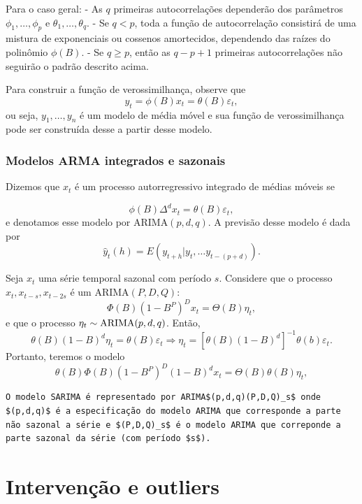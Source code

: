 \documentclass[
  letterpaper,
  DIV=11,
  numbers=noendperiod]{scrartcl}
\theoremstyle{plain}
\theoremstyle{plain}
\theoremstyle{definition}
\theoremstyle{definition}
\theoremstyle{remark}
\begin{document}
Para o caso geral: - As \(q\) primeiras autocorrelações dependerão dos
parâmetros \(\phi_1,\ldots,\phi_p\) e \(\theta_1,\ldots,\theta_q\). - Se
\(q<p\), toda a função de autocorrelação consistirá de uma mistura de
exponenciais ou cossenos amortecidos, dependendo das raízes do polinômio
\(\phi(B)\). - Se \(q\geq p\), então as \(q-p+1\) primeiras
autocorrelações não seguirão o padrão descrito acima.

Para construir a função de verossimilhança, observe que
\[y_t=\phi(B)x_t=\theta(B)\varepsilon_t,\] ou seja, \(y_1,\ldots,y_n\) é
um modelo de média móvel e sua função de verossimilhança pode ser
construída desse a partir desse modelo.

\hypertarget{modelos-arma-integrados-e-sazonais}{%
\subsection{Modelos ARMA integrados e
sazonais}\label{modelos-arma-integrados-e-sazonais}}

Dizemos que \(x_t\) é um processo autorregressivo integrado de médias
móveis se

\[\phi(B)\Delta^d x_t =\theta(B)\varepsilon_t,\] e denotamos esse modelo
por ARIMA\((p,d,q)\). A previsão desse modelo é dada por
\[\hat{y}_t(h)=E(y_{t+h}|y_t,\ldots y_{t-(p+d)}).\]

Seja \(x_t\) uma série temporal sazonal com período \(s\). Considere que
o processo \({x_t,x_{t-s},x_{t-2s}}\) é um ARIMA\((P,D,Q)\):
\[\Phi(B)(1-B^P)^Dx_t = \Theta(B)\eta_t,\] e que o processo
\(\eta_t\sim \hbox{ARIMA}(p,d,q)\). Então,
\[\theta(B)(1-B)^d\eta_t = \theta(B)\varepsilon_t\Rightarrow \eta_t = \left[\theta(B)(1-B)^d\right]^{-1}\theta(b)\varepsilon_t.\]
Portanto, teremos o modelo
\[\theta(B)\Phi(B)(1-B^P)^D(1-B)^dx_t = \Theta(B)\theta(B)\eta_t,\]

\begin{verbatim}
O modelo SARIMA é representado por ARIMA$(p,d,q)(P,D,Q)_s$ onde $(p,d,q)$ é a especificação do modelo ARIMA que corresponde a parte não sazonal a série e $(P,D,Q)_s$ é o modelo ARIMA que correponde a parte sazonal da série (com período $s$).
\end{verbatim}


\hypertarget{intervenuxe7uxe3o-e-outliers}{%
\chapter{Intervenção e outliers}\label{intervenuxe7uxe3o-e-outliers}}
\end{document}
